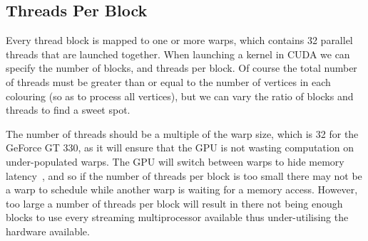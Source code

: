 \subsection{Threads Per Block}\label{sec:thread_size}
Every thread block is mapped to one or more warps, which contains 32 parallel threads that are launched together. When launching a kernel in CUDA we can specify the number of blocks, and threads per block. Of course the total number of threads must be greater than or equal to the number of vertices in each colouring (so as to process all vertices), but we can vary the ratio of blocks and threads to find a sweet spot.

The number of threads should be a multiple of the warp size, which is 32 for the GeForce GT 330, as it will ensure that the GPU is not wasting computation on under-populated warps. The GPU will switch between warps to hide memory latency~\cite{threads_atomics}, and so if the number of threads per block is too small there may not be a warp to schedule while another warp is waiting for a memory access. However, too large a number of threads per block will result in there not being enough blocks to use every streaming multiprocessor available thus under-utilising the hardware available.